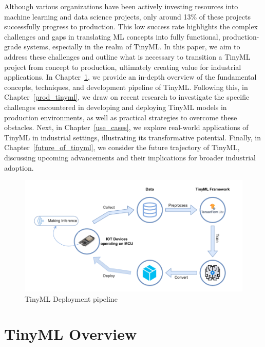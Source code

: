 \documentclass[twocolumn]{article}
\begin{document}
Although various organizations have been actively investing resources into machine learning and data science projects, only around 13\% of these projects successfully progress to production.\footnotemark {} 
This low success rate highlights the complex challenges and gaps in translating ML concepts into fully functional, production-grade systems, especially in the realm of TinyML. In this paper, we aim to address these challenges and outline what is necessary to transition a TinyML project from concept to production, ultimately creating value for industrial applications. In Chapter~\ref{tinyml_overview}, we provide an in-depth overview of the fundamental concepts, techniques, and development pipeline of TinyML. Following this, in Chapter~\ref{prod_tinyml}, we draw on recent research to investigate the specific challenges encountered in developing and deploying TinyML models in production environments, as well as practical strategies to overcome these obstacles. Next, in Chapter~\ref{use_cases}, we explore real-world applications of TinyML in industrial settings, illustrating its transformative potential. Finally, in Chapter~\ref{future_of_tinyml}, we consider the future trajectory of TinyML, discussing upcoming advancements and their implications for broader industrial adoption.
\begin{figure}
	\centerline{
	\includegraphics[width=1\columnwidth]{resource/tinyml_deployment.pdf}
	}
	\caption{TinyML Deployment pipeline}
	\label{TUM}
\end{figure}

\section{TinyML Overview} 
\label{tinyml_overview}
\end{document}
